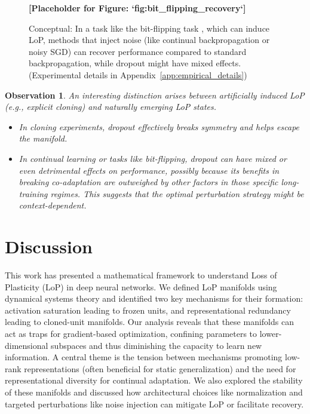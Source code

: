 \documentclass{article}
\newtheorem{observation}{Observation}[section]
\begin{document}
\begin{figure}[ht!]
    \centering
    \textbf{[Placeholder for Figure: `fig:bit_flipping_recovery`]}
    \caption{Conceptual: In a task like the bit-flipping task \citep{dohare2024loss}, which can induce LoP, methods that inject noise (like continual backpropagation or noisy SGD) can recover performance compared to standard backpropagation, while dropout might have mixed effects. (Experimental details in Appendix~\ref{app:empirical_details})}
    \label{fig:bit_flipping_recovery_placeholder}
\end{figure}

\begin{observation}
An interesting distinction arises between artificially induced LoP (e.g., explicit cloning) and naturally emerging LoP states.
\begin{itemize}
    \item In cloning experiments, dropout effectively breaks symmetry and helps escape the manifold.
    \item In continual learning or tasks like bit-flipping, dropout can have mixed or even detrimental effects on performance, possibly because its benefits in breaking co-adaptation are outweighed by other factors in those specific long-training regimes. This suggests that the optimal perturbation strategy might be context-dependent.
\end{itemize}
\end{observation}

\section{Discussion}
\label{sec:discussion}

This work has presented a mathematical framework to understand Loss of Plasticity (LoP) in deep neural networks. We defined LoP manifolds using dynamical systems theory and identified two key mechanisms for their formation: activation saturation leading to frozen units, and representational redundancy leading to cloned-unit manifolds. Our analysis reveals that these manifolds can act as traps for gradient-based optimization, confining parameters to lower-dimensional subspaces and thus diminishing the capacity to learn new information. A central theme is the tension between mechanisms promoting low-rank representations (often beneficial for static generalization) and the need for representational diversity for continual adaptation. We also explored the stability of these manifolds and discussed how architectural choices like normalization and targeted perturbations like noise injection can mitigate LoP or facilitate recovery.
\end{document}

